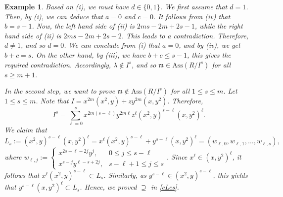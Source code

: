\documentclass[11pt]{amsart}
\newtheorem{example}[theorem]{Example}
\begin{document}
\begin{example}
{ Based on (i), we must have $d\in \{0,1\}$. We first assume that $d=1$. Then, by (i), we can deduce that $a=0$ and $c=0$. It follows from (iv) that $b=s-1$. 
 Now, the left hand side of (ii) is $2ms-2m+2s-1$, while the right hand side of (ii) is $2ms-2m+2s-2$. This leads to a contradiction. Therefore, $d\neq 1$, and so 
 $d=0$. We can conclude from (i) that $a=0$, and by (iv), we get $b+c=s$. On the other hand, by (iii), we have $b+c \leq s-1$, this gives the required contradiction. Accordingly, $\lambda \notin I^s$, and so $\mathfrak{m} \in \mathrm{Ass}(R/I^s)$ for all $s\geq m+1$.  
  
  In the  second  step,  we want to  prove   $\mathfrak{m} \notin \mathrm{Ass}(R/I^s)$ for all  $1\leq s \leq m$. 
  Let $1\leq s\leq m$. Note that $I=x^{2m}(x^2,y)+zy^{2m}(x,y^2)$. Therefore,
\begin{equation}\label{Ies}
I^s = \sum_{\ell=0}^s x^{2m(s-\ell)}y^{2m\ell}z^{\ell}(x^2,y)^{s-\ell}(x,y^2)^{\ell}.
\end{equation}
We claim that
\begin{equation}\label{eLes}
L_s:=(x^2,y)^{s-\ell}(x,y^2)^{\ell} = x^{\ell}(x^2,y)^{s-\ell}+y^{s-\ell}(x,y^2)^{\ell} = (w_{\ell,0},w_{\ell,1},\ldots,w_{\ell,s}),
\end{equation}
where $w_{\ell,j}:=\begin{cases} x^{2s-\ell-2j}y^j, & 0\leq j\leq s-\ell \\ x^{s-j}y^{\ell-s+2j},& s-\ell+1\leq j \leq s \end{cases}$.
Since $x^{\ell} \in (x,y^2)^{\ell}$, it follows that $x^{\ell}(x^2,y)^{s-\ell}\subset L_s$.
Similarly, as $y^{s-\ell}\in (x^2,y)^{s-\ell}$, this yields that   $y^{s-\ell}(x,y^2)^{\ell}\subset L_s$.
Hence, we proved $\supseteq$ in \eqref{eLes}. 

}
\end{example}
\end{document}
